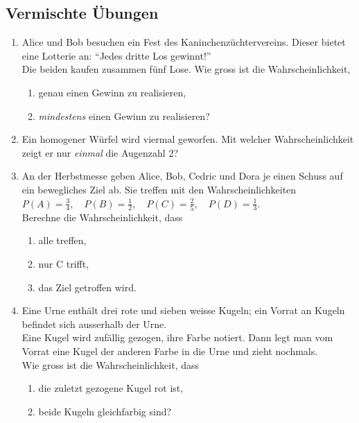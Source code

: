\subsection{Vermischte Übungen}
\begin{ueb}
  {}{}
  \begin{enumerate}


    \item Alice und Bob besuchen ein Fest des Kaninchenzüchtervereins. Dieser bietet eine Lotterie an:  ``Jedes dritte Los gewinnt!''\\
          Die beiden kaufen zusammen fünf Lose. Wie gross ist die Wahrscheinlichkeit,
          \begin{enumerate}
            \item genau einen Gewinn zu realisieren,
            \item \emph{mindestens} einen Gewinn zu realisieren?
          \end{enumerate}

    \item Ein homogener Würfel wird viermal geworfen. Mit welcher Wahrscheinlichkeit zeigt er nur \emph{einmal} die Augenzahl 2?

    \item An der Herbstmesse geben Alice, Bob, Cedric und Dora je einen Schuss auf ein bewegliches Ziel ab. Sie treffen mit den Wahrscheinlichkeiten \\
          \( P(A) = \frac{3}{4}, \quad P(B) = \frac{1}{2}, \quad P(C) = \frac{2}{5}, \quad P(D) = \frac{1}{3} \).\\
          Berechne die Wahrscheinlichkeit, dass
          \begin{enumerate}
            \item alle treffen,
            \item nur C trifft,
            \item das Ziel getroffen wird.
          \end{enumerate}

    \item Eine Urne enthält drei rote und sieben weisse Kugeln; ein Vorrat an Kugeln befindet sich ausserhalb der Urne.\\
          Eine Kugel wird zufällig gezogen, ihre Farbe notiert. Dann legt man vom Vorrat eine Kugel der anderen Farbe in die Urne und zieht nochmals.\\
          Wie gross ist die Wahrscheinlichkeit, dass
          \begin{enumerate}
            \item die zuletzt gezogene Kugel rot ist,
            \item beide Kugeln gleichfarbig sind?
          \end{enumerate}


\end{enumerate}
\end{ueb}
